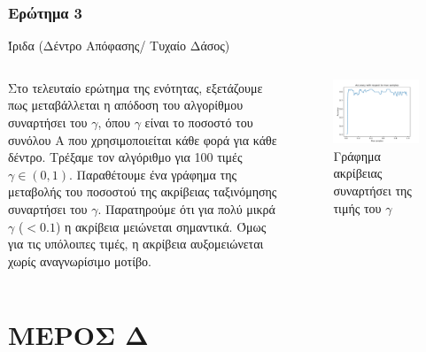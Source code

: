 \documentclass{beamer}
\begin{document}
\subsubsection{Ερώτημα 3}
\begin{frame}{Ίριδα (Δέντρο Απόφασης/ Τυχαίο Δάσος)}
    \begin{columns}

       Στο τελευταίο ερώτημα της ενότητας, εξετάζουμε πως μεταβάλλεται η απόδοση του αλγορίθμου συναρτήσει του \(\gamma\), όπου \(\gamma\) είναι το ποσοστό του συνόλου Α που χρησιμοποιείται κάθε φορά για κάθε δέντρο. Τρέξαμε τον αλγόριθμο για 100 τιμές $\gamma \in (0,1)$. Παραθέτουμε ένα γράφημα της μεταβολής του ποσοστού της ακρίβειας ταξινόμησης συναρτήσει του \(\gamma\). Παρατηρούμε ότι για πολύ μικρά $\gamma$ ($<0.1$) η ακρίβεια μειώνεται σημαντικά. Όμως για τις υπόλοιπες τιμές, η ακρίβεια αυξομειώνεται χωρίς αναγνωρίσιμο μοτίβο.




    \begin{figure}
        \centering
            \includegraphics[width=\textwidth]{../plots/accuracy.pdf}
            \caption{Γράφημα ακρίβειας συναρτήσει της τιμής του \(\gamma\)}
            \label{fig:accuracy}
    \end{figure}


\end{columns}
\end{frame}




\section{ΜΕΡΟΣ Δ}
\end{document}
